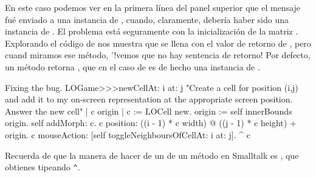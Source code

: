 \documentclass[a4paper,10pt,twoside]{book}
\begin{document}
En este caso podemos ver en la primera l\'inea del panel superior que el mensaje  fu\'e enviado a una instancia de , cuando, claramente, deber\'ia haber sido una instancia de .
El problema est\'a seguramente con la inicializaci\'on de la matriz .
Explorando el c\'odigo de  nos muestra que  se llena con el valor de retorno de , pero cuand miramos ese m\'etodo, '!vemos que no hay sentencia de retorno!
Por defecto, un m\'etodo retorna , que en el caso de  es de hecho una instancia de .



\begin{method}{Fixing the bug.}
LOGame>>>newCellAt: i at: j
   "Create a cell for position (i,j) and add it to my on-screen
   representation at the appropriate screen position.  Answer the new cell"
   | c origin |
   c := LOCell new.
   origin := self innerBounds origin.
   self addMorph: c.
   c position: ((i - 1) * c width) @ ((j - 1) * c height) + origin.
   c mouseAction: [self toggleNeighboursOfCellAt: i at: j].
   ^ c
\end{method}

\noindent
Recuerda de  que la manera de hacer  de un  de un m\'etodo en Smalltalk es \ct{^}, que obtienes tipeando \verb|^|.
\end{document}
